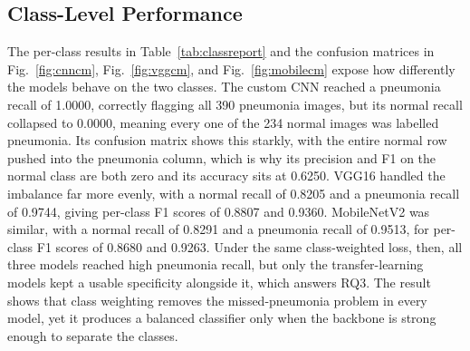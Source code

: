 \documentclass[preprint,12pt]{elsarticle}
\begin{document}
\subsection{Class-Level Performance}
The per-class results in Table~\ref{tab:classreport} and the confusion matrices in Fig.~\ref{fig:cnncm}, Fig.~\ref{fig:vggcm}, and Fig.~\ref{fig:mobilecm} expose how differently the models behave on the two classes.
The custom CNN reached a pneumonia recall of 1.0000, correctly flagging all 390 pneumonia images, but its normal recall collapsed to 0.0000, meaning every one of the 234 normal images was labelled pneumonia.
Its confusion matrix shows this starkly, with the entire normal row pushed into the pneumonia column, which is why its precision and F1 on the normal class are both zero and its accuracy sits at 0.6250.
VGG16 handled the imbalance far more evenly, with a normal recall of 0.8205 and a pneumonia recall of 0.9744, giving per-class F1 scores of 0.8807 and 0.9360.
MobileNetV2 was similar, with a normal recall of 0.8291 and a pneumonia recall of 0.9513, for per-class F1 scores of 0.8680 and 0.9263.
Under the same class-weighted loss, then, all three models reached high pneumonia recall, but only the transfer-learning models kept a usable specificity alongside it, which answers RQ3.
The result shows that class weighting removes the missed-pneumonia problem in every model, yet it produces a balanced classifier only when the backbone is strong enough to separate the classes.
\end{document}
